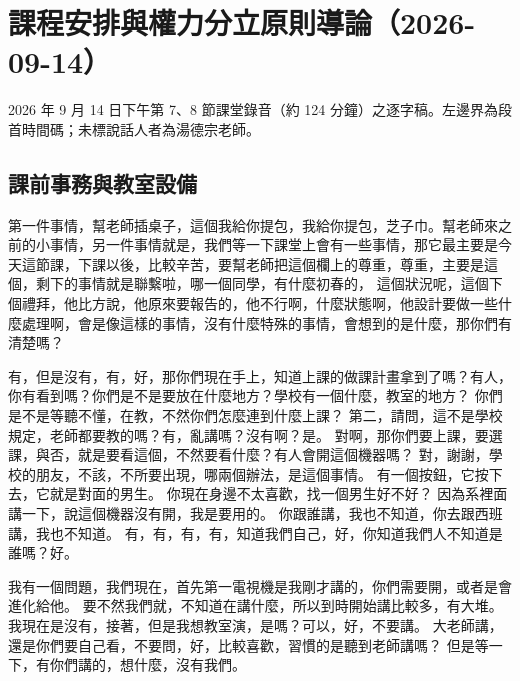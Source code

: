 \chapter{課程安排與權力分立原則導論（2026-09-14）}

2026 年 9 月 14 日下午第 7、8 節課堂錄音（約 124 分鐘）之逐字稿。左邊界為段首時間碼；未標說話人者為湯德宗老師。


\section{課前事務與教室設備}

\hypertarget{c01:cue:1}{}第一件事情，幫老師插桌子，這個我給你提包，我給你提包，芝子巾。幫老師來之前的小事情，另一件事情就是，我們等一下課堂上會有一些事情，那它最主要是今天這節課，下課以後，比較辛苦，要幫老師把這個欄上的尊重，尊重，主要是這個，剩下的事情就是聯繫啦，哪一個同學，有什麼初春的，
\hypertarget{c01:cue:2}{}這個狀況呢，這個下個禮拜，他比方說，他原來要報告的，他不行啊，什麼狀態啊，他設計要做一些什麼處理啊，會是像這樣的事情，沒有什麼特殊的事情，會想到的是什麼，那你們有清楚嗎？

\hypertarget{c01:cue:3}{}有，但是沒有，有，好，那你們現在手上，知道上課的做課計畫拿到了嗎？有人，你有看到嗎？你們是不是要放在什麼地方？學校有一個什麼，教室的地方？
\hypertarget{c01:cue:4}{}你們是不是等聽不懂，在教，不然你們怎麼連到什麼上課？
\hypertarget{c01:cue:5}{}第二，請問，這不是學校規定，老師都要教的嗎？有，亂講嗎？沒有啊？是。
\hypertarget{c01:cue:6}{}對啊，那你們要上課，要選課，與否，就是要看這個，不然要看什麼？有人會開這個機器嗎？
\hypertarget{c01:cue:7}{}對，謝謝，學校的朋友，不該，不所要出現，哪兩個辦法，是這個事情。
\hypertarget{c01:cue:8}{}有一個按鈕，它按下去，它就是對面的男生。
\hypertarget{c01:cue:9}{}你現在身邊不太喜歡，找一個男生好不好？
\hypertarget{c01:cue:10}{}因為系裡面講一下，說這個機器沒有開，我是要用的。
\hypertarget{c01:cue:11}{}你跟誰講，我也不知道，你去跟西班講，我也不知道。
\hypertarget{c01:cue:12}{}有，有，有，有，知道我們自己，好，你知道我們人不知道是誰嗎？好。

\hypertarget{c01:cue:13}{}我有一個問題，我們現在，首先第一電視機是我剛才講的，你們需要開，或者是會進化給他。
\hypertarget{c01:cue:14}{}要不然我們就，不知道在講什麼，所以到時開始講比較多，有大堆。
\hypertarget{c01:cue:15}{}我現在是沒有，接著，但是我想教室演，是嗎？可以，好，不要講。
\hypertarget{c01:cue:16}{}大老師講，還是你們要自己看，不要問，好，比較喜歡，習慣的是聽到老師講嗎？
\hypertarget{c01:cue:17}{}但是等一下，有你們講的，想什麼，沒有我們。

